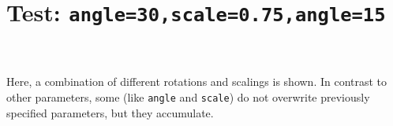 \documentclass[DIV12]{scrartcl}
\newcommand*\combinput[1]{%
  \begin{picture}(0,0)%
    \texttt{[image: \#1]}%
  \end{picture}%
}
\begin{document}
  \clearpage

  \section*{Test: \texttt{angle=30,scale=0.75,angle=15}}
  \noindent
  \fbox{\combinput{xfig325}}%
  \fbox{}\\[3ex]
    \\[3ex]
  Here, a combination of different rotations and scalings is shown.  In contrast
  to other parameters, some (like \texttt{angle} and \texttt{scale}) do not
  overwrite previously specified parameters, but they accumulate.
\end{document}
